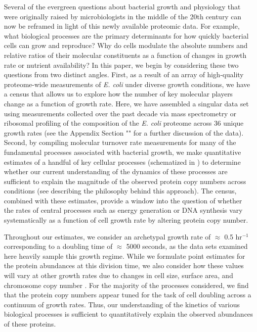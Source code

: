 Several of the evergreen questions about bacterial growth and physiology that
were originally raised by microbiologists in the middle of the 20th century
can now be reframed in light of this newly available proteomic data. For
example, what biological processes are the primary determinants for how
quickly bacterial cells can grow and reproduce? Why do cells modulate the
absolute numbers and relative ratios of their molecular constituents as a
function of changes in growth rate or nutrient availability? In this paper,
we begin by considering these two questions from two distinct angles. First,
as a result of an array of high-quality proteome-wide measurements of
\textit{E. coli} under diverse growth conditions, we have a census that
allows us to explore how the number of key molecular players change as a
function of growth rate. Here, we have assembled a singular data set using
measurements collected over the past decade via mass spectrometry
\citep{schmidt2016, peebo2015, valgepea2013} or ribosomal profiling
\citep{li2014} of the composition of the \textit{E. coli} proteome across 36
unique growth rates (see the Appendix Section ""
for a further discussion of the data). Second, by compiling molecular
turnover rate measurements for many of the fundamental processes associated
with bacterial growth, we make quantitative estimates of a handful of key
cellular processes (schematized in ) to determine whether our
current understanding of the dynamics of these processes are sufficient to
explain the magnitude of the observed protein copy numbers across conditions
(see  describing the philosophy behind this approach).
The census, combined with these estimates, provide a window into the question
of whether the rates of central processes such as energy generation or DNA
synthesis vary systematically as a function of cell growth rate by altering
protein copy number.

Throughout our estimates, we consider an archetypal growth rate of $\approx$
0.5 hr$^{-1}$ corresponding to a doubling time of $\approx$ 5000 seconds, as
the data sets examined here heavily sample this growth regime. While we
formulate point estimates for the protein abundances at this division time,
we also consider how these values will vary at other growth rates due to
changes in cell size, surface area, and chromosome copy number
\citep{taheriaraghi2015, harris2018}. For the majority of the processes
considered, we find that the protein copy numbers appear tuned for the task
of cell doubling across a continuum of growth rates. Thus, our understanding
of the kinetics of various biological processes is sufficient to
quantitatively explain the observed abundances of these proteins.

